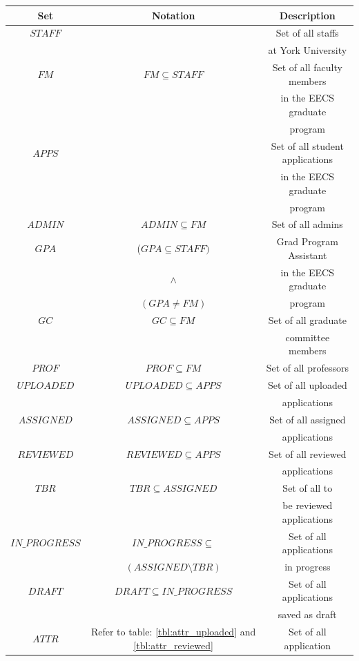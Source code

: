 \documentclass[fontsize=12pt,paper=letter,twoside]{scrartcl}
\begin{document}
\begin{table}[!htb]
\begin{tabular}{| c | c | c |}
	\cline{1-3}
	\textbf{Set} & \textbf{Notation} & \textbf{Description} \\ \hline
	$STAFF$ & & Set of all staffs \\
	& & at York University\\ \hline
	$FM$ & $FM \subseteq STAFF$ & Set of all faculty members \\
	& & in the EECS graduate\\
	& & program \\ \hline
	$APPS$ & & Set of all student applications\\
	& & in the EECS graduate \\
	& & program \\ \hline
	$ADMIN$ & $ADMIN \subseteq FM$ & Set of all admins \\ \hline
	$GPA$ & ($GPA \subseteq STAFF)$ & Grad Program Assistant \\
	& $\land$ & in the EECS graduate \\
	& $(GPA \neq FM)$ & program \\ \hline
	$GC$ & $GC \subseteq FM$  & Set of all graduate \\
	& & committee members\\ \hline
	$PROF$ & $PROF \subseteq FM$ & Set of all professors \\ \hline 
	$UPLOADED$ & $UPLOADED \subseteq APPS$ & Set of all uploaded \\
	& & applications \\ \hline
	$ASSIGNED$ & $ASSIGNED \subseteq APPS$ & Set of all assigned \\
	& & applications \\ \hline
	$REVIEWED$ & $REVIEWED \subseteq APPS$ & Set of all reviewed \\
	& & applications \\ \hline
	$TBR$ & $TBR \subseteq ASSIGNED$ & Set of all to \\
	& & be reviewed applications \\ \hline
	$IN\_PROGRESS$ & $IN\_PROGRESS \subseteq$ & Set of all applications \\
	& $(ASSIGNED \setminus TBR)$ & in progress \\ \hline
	$DRAFT$ & $DRAFT \subseteq IN\_PROGRESS$ & Set of all applications \\
	& & saved as draft\\ \hline
	$ATTR$ & Refer to table: \ref{tbl:attr_uploaded} and \ref{tbl:attr_reviewed} & Set of all application \\

\end{tabular}
\end{table}
\end{document}
